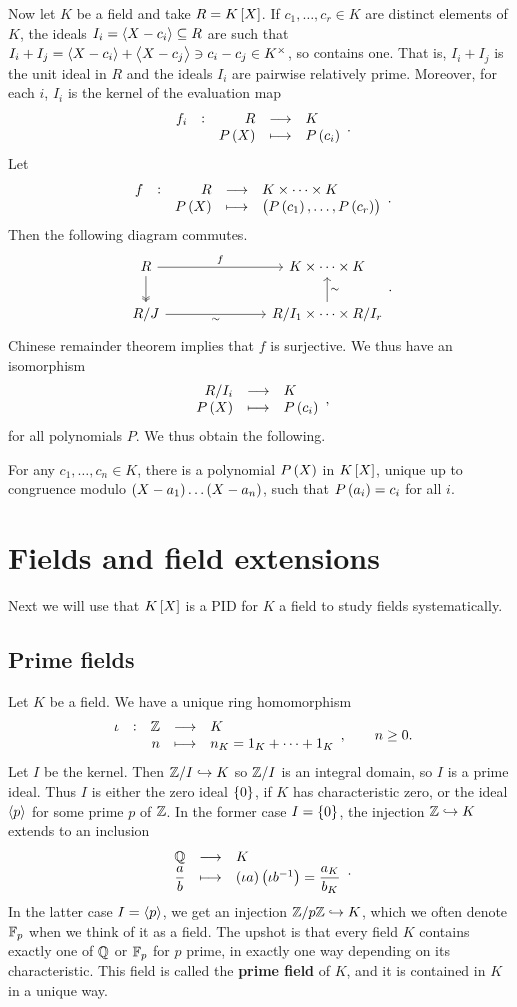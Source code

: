 Now let $ K $ be a field and take $ R = K\sbr{X} $. If $ c_1, \dots, c_r \in K $ are distinct elements of $ K $, the ideals $ I_i = \left\langle X - c_i \right\rangle \subseteq R $ are such that $ I_i + I_j = \left\langle X - c_i \right\rangle + \left\langle X - c_j \right\rangle \ni c_i - c_j \in K^\times $, so contains one. That is, $ I_i + I_j $ is the unit ideal in $ R $ and the ideals $ I_i $ are pairwise relatively prime. Moreover, for each $ i $, $ I_i $ is the kernel of the evaluation map
$$ \function[f_i]{R}{K}{P\br{X}}{P\br{c_i}}. $$
Let
$$ \function[f]{R}{K \times \dots \times K}{P\br{X}}{\br{P\br{c_1}, \dots, P\br{c_r}}}. $$
Then the following diagram commutes.
$$
\begin{tikzcd}[column sep=1in]
R \arrow{r}{f} \arrow[twoheadrightarrow]{d} & K \times \dots \times K \\
R / J \arrow{r}[swap]{\sim} & R / I_1 \times \dots \times R / I_r \arrow{u}[swap]{\sim}
\end{tikzcd}.
$$
Chinese remainder theorem implies that $ f $ is surjective. We thus have an isomorphism
$$ \function{R / I_i}{K}{P\br{X}}{P\br{c_i}}, $$
for all polynomials $ P $. We thus obtain the following.

\begin{theorem}
For any $ c_1, \dots, c_n \in K $, there is a polynomial $ P\br{X} $ in $ K\sbr{X} $, unique up to congruence modulo $ \br{X - a_1} \dots \br{X - a_n} $, such that $ P\br{a_i} = c_i $ for all $ i $.
\end{theorem}

\pagebreak

\section{Fields and field extensions}


Next we will use that $ K\sbr{X} $ is a PID for $ K $ a field to study fields systematically.

\subsection{Prime fields}

Let $ K $ be a field. We have a unique ring homomorphism
$$ \function[\iota]{\ZZ}{K}{n}{n_K = 1_K + \dots + 1_K}, \qquad n \ge 0. $$
Let $ I $ be the kernel. Then $ \mathbb{Z} / I \hookrightarrow K $ so $ \mathbb{Z} / I $ is an integral domain, so $ I $ is a prime ideal. Thus $ I $ is either the zero ideal $ \cbr{0} $, if $ K $ has characteristic zero, or the ideal $ \left\langle p \right\rangle $ for some prime $ p $ of $ \mathbb{Z} $. In the former case $ I = \cbr{0} $, the injection $ \mathbb{Z} \hookrightarrow K $ extends to an inclusion
$$ \function{\QQ}{K}{\dfrac{a}{b}}{\br{\iota a}\br{\iota b^{-1}} = \dfrac{a_K}{b_K}}. $$
In the latter case $ I = \left\langle p \right\rangle $, we get an injection $ \mathbb{Z} / p\mathbb{Z} \hookrightarrow K $, which we often denote $ \mathbb{F}_p $ when we think of it as a field. The upshot is that every field $ K $ contains exactly one of $ \mathbb{Q} $ or $ \mathbb{F}_p $ for $ p $ prime, in exactly one way depending on its characteristic. This field is called the \textbf{prime field} of $ K $, and it is contained in $ K $ in a unique way.

